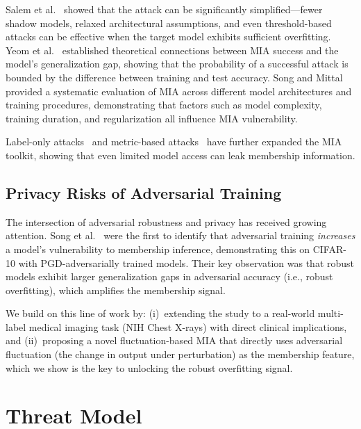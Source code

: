\documentclass[conference]{IEEEtran}
\begin{document}
Salem et al.~\cite{salem2019ml} showed that the attack can be significantly simplified---fewer shadow models, relaxed architectural assumptions, and even threshold-based attacks can be effective when the target model exhibits sufficient overfitting. Yeom et al.~\cite{yeom2018privacy} established theoretical connections between MIA success and the model's generalization gap, showing that the probability of a successful attack is bounded by the difference between training and test accuracy. Song and Mittal~\cite{song2021systematic} provided a systematic evaluation of MIA across different model architectures and training procedures, demonstrating that factors such as model complexity, training duration, and regularization all influence MIA vulnerability.

Label-only attacks~\cite{choquette2021label} and metric-based attacks~\cite{carlini2022membership} have further expanded the MIA toolkit, showing that even limited model access can leak membership information.

\subsection{Privacy Risks of Adversarial Training}

The intersection of adversarial robustness and privacy has received growing attention. Song et al.~\cite{song2019privacy} were the first to identify that adversarial training \textit{increases} a model's vulnerability to membership inference, demonstrating this on CIFAR-10 with PGD-adversarially trained models. Their key observation was that robust models exhibit larger generalization gaps in adversarial accuracy (i.e., robust overfitting), which amplifies the membership signal.

We build on this line of work by: (i)~extending the study to a real-world multi-label medical imaging task (NIH Chest X-rays) with direct clinical implications, and (ii)~proposing a novel fluctuation-based MIA that directly uses adversarial fluctuation (the change in output under perturbation) as the membership feature, which we show is the key to unlocking the robust overfitting signal.



\section{Threat Model}
\label{sec:threat_model}
\end{document}
